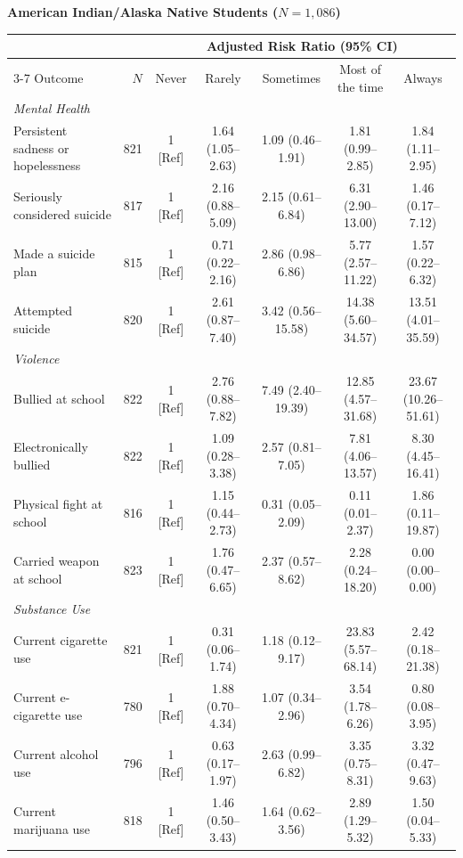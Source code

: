 \documentclass[12pt]{article}
\begin{document}
\begin{landscape}
\nobreak\noindent\textbf{American Indian/Alaska Native Students ($N = 1,086$)}
\nopagebreak\par\nopagebreak\vspace{1pt}\nopagebreak
\nobreak\noindent\begin{tabular}{l r ccccc}
\toprule
 & & \multicolumn{5}{c}{Adjusted Risk Ratio (95\% CI)} \\
\cmidrule(lr){3-7}
Outcome & $N$ & Never & Rarely & Sometimes & Most of the time & Always \\
\midrule
\textit{Mental Health} \\
\quad Persistent sadness or hopelessness & 821 & 1 [Ref] & 1.64 (1.05--2.63) & 1.09 (0.46--1.91) & 1.81 (0.99--2.85) & 1.84 (1.11--2.95) \\
\quad Seriously considered suicide & 817 & 1 [Ref] & 2.16 (0.88--5.09) & 2.15 (0.61--6.84) & 6.31 (2.90--13.00) & 1.46 (0.17--7.12) \\
\quad Made a suicide plan & 815 & 1 [Ref] & 0.71 (0.22--2.16) & 2.86 (0.98--6.86) & 5.77 (2.57--11.22) & 1.57 (0.22--6.32) \\
\quad Attempted suicide & 820 & 1 [Ref] & 2.61 (0.87--7.40) & 3.42 (0.56--15.58) & 14.38 (5.60--34.57) & 13.51 (4.01--35.59) \\
\addlinespace[4pt]
\textit{Violence} \\
\quad Bullied at school & 822 & 1 [Ref] & 2.76 (0.88--7.82) & 7.49 (2.40--19.39) & 12.85 (4.57--31.68) & 23.67 (10.26--51.61) \\
\quad Electronically bullied & 822 & 1 [Ref] & 1.09 (0.28--3.38) & 2.57 (0.81--7.05) & 7.81 (4.06--13.57) & 8.30 (4.45--16.41) \\
\quad Physical fight at school & 816 & 1 [Ref] & 1.15 (0.44--2.73) & 0.31 (0.05--2.09) & 0.11 (0.01--2.37) & 1.86 (0.11--19.87) \\
\quad Carried weapon at school & 823 & 1 [Ref] & 1.76 (0.47--6.65) & 2.37 (0.57--8.62) & 2.28 (0.24--18.20) & 0.00 (0.00--0.00) \\
\addlinespace[4pt]
\textit{Substance Use} \\
\quad Current cigarette use & 821 & 1 [Ref] & 0.31 (0.06--1.74) & 1.18 (0.12--9.17) & 23.83 (5.57--68.14) & 2.42 (0.18--21.38) \\
\quad Current e-cigarette use & 780 & 1 [Ref] & 1.88 (0.70--4.34) & 1.07 (0.34--2.96) & 3.54 (1.78--6.26) & 0.80 (0.08--3.95) \\
\quad Current alcohol use & 796 & 1 [Ref] & 0.63 (0.17--1.97) & 2.63 (0.99--6.82) & 3.35 (0.75--8.31) & 3.32 (0.47--9.63) \\
\quad Current marijuana use & 818 & 1 [Ref] & 1.46 (0.50--3.43) & 1.64 (0.62--3.56) & 2.89 (1.29--5.32) & 1.50 (0.04--5.33) \\
\bottomrule
\end{tabular}\par\vspace{8pt}


\end{landscape}
\end{document}
